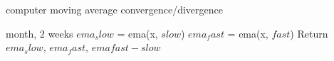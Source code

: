 \documentclass{article}
\begin{document}
	\begin{algorithm}
		\caption{computer moving average convergence/divergence}
		\label{macd}
		\begin{algorithmic}[1]
			 month, 2 weeks
				\State $ema_slow$ = ema(x, $slow$)
				\State $ema_fast$ = ema(x, $fast$)
			\State Return $ema_slow$, $ema_fast$, $emafast-slow$
			\EndProcedure
		\end{algorithmic}
	\end{algorithm}
\end{document}
